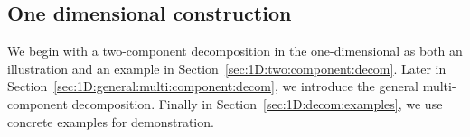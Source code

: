 \documentclass[review,hidelinks,onefignum,onetabnum]{siamart250211}
\begin{document}
\subsection{One dimensional construction}
\label{sec:decomposition:1D}

We begin with a two-component decomposition in the one-dimensional as both an illustration and an example in Section~\ref{sec:1D:two:component:decom}. Later in Section~\ref{sec:1D:general:multi:component:decom}, we introduce the general multi-component decomposition. Finally in Section~\ref{sec:1D:decom:examples}, we use concrete examples for demonstration.


\end{document}

